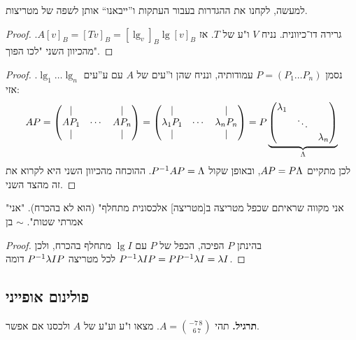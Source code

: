 \documentclass[name=רשימות אלגברה לינארית 2א]{../../../tex/classes/megasumPreamble}
\begin{document}
	למעשה, לקחנו את ההגדרות בעבור העתקות ו''ייבאנו`` אותן לשפה של מטריצות. 
	
	
	\begin{proof}
		גרירה דו־כיוונית. 
		נניח $V$ ו"ע של $T$. אז $A[v]_B = [Tv]_B = [\lg_v]_B \lg[v]_B$. מהכיוון השני "לכו הפוך". 
	\end{proof}
	
	
	
	\begin{proof}
נסמן $P = (P_1 \dots P_n)$ עמודותיה, ונניח שהן ו''עים של $A$ עם ע''עים $\lg_1 \dots \lg_n$. אזי: 
		\[ AP = \begin{pmatrix} \vert && \vert \\ AP_1 &\cdots& AP_n \\ \vert && \vert \end{pmatrix} = \begin{pmatrix} \vert && \vert \\ \lambda_1P_1 &\cdots& \lambda_nP_n \\ \vert && \vert \end{pmatrix} = P\underbrace{\begin{pmatrix} \lambda_1 && \\ & \ddots & \\ && \lambda_n \end{pmatrix}}_{\Lambda} \]
		לכן מתקיים $AP = P\Lambda$, ובאופן שקול $P^{-1} A P = \Lambda$. 
		ההוכחה מהכיוון השני היא לקרוא את זה מהצד השני. 
	\end{proof}
	
	"אני מקווה שראיתם שכפל מטריצה ב[מטריצה] אלכסונית מתחלף" (הוא לא בהכרח). 
	"אני אמרתי שטות". $\sim$ בן 
	
	\begin{proof}
		בהינתן $P$ הפיכה, הכפל של $P$ עם $\lg I$ מתחלף בהכרח, ולכן $P^{-1} \lambda I P = P P^{-1} \lambda I = \lambda I$ לכל מטריצה $P^{-1} \lambda I P$ דומה. 
	\end{proof}
	
	\subsection{פולינום אופייני}
	\textbf{תרגיל. }תהי $A = \binom{-7 \, 8}{\,\,6 \, 7}$. מצאו ו"ע וע"ע של $A$ ולכסנו אם אפשר. 
	
\end{document}
